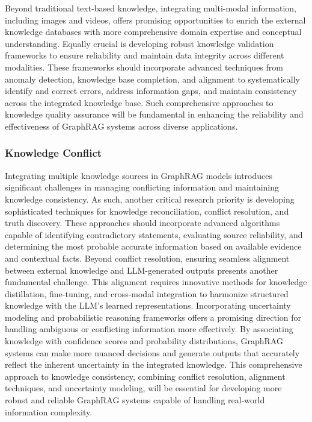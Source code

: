 \documentclass[lettersize,journal]{IEEEtran}
\begin{document}
Beyond traditional text-based knowledge, integrating multi-modal information, including images and videos, offers promising opportunities to enrich the external knowledge databases with more comprehensive domain expertise and conceptual understanding. Equally crucial is developing robust knowledge validation frameworks to ensure reliability and maintain data integrity across different modalities. These frameworks should incorporate advanced techniques from anomaly detection, knowledge base completion, and alignment to systematically identify and correct errors, address information gaps, and maintain consistency across the integrated knowledge base. Such comprehensive approaches to knowledge quality assurance will be fundamental in enhancing the reliability and effectiveness of GraphRAG systems across diverse applications.

\subsubsection{Knowledge Conflict}
Integrating multiple knowledge sources in GraphRAG models introduces significant challenges in managing conflicting information and maintaining knowledge consistency. As such, another critical research priority is developing sophisticated techniques for knowledge reconciliation, conflict resolution, and truth discovery. These approaches should incorporate advanced algorithms capable of identifying contradictory statements, evaluating source reliability, and determining the most probable accurate information based on available evidence and contextual facts. Beyond conflict resolution, ensuring seamless alignment between external knowledge and LLM-generated outputs presents another fundamental challenge. This alignment requires innovative methods for knowledge distillation, fine-tuning, and cross-modal integration to harmonize structured knowledge with the LLM's learned representations. Incorporating uncertainty modeling and probabilistic reasoning frameworks offers a promising direction for handling ambiguous or conflicting information more effectively. By associating knowledge with confidence scores and probability distributions, GraphRAG systems can make more nuanced decisions and generate outputs that accurately reflect the inherent uncertainty in the integrated knowledge. This comprehensive approach to knowledge consistency, combining conflict resolution, alignment techniques, and uncertainty modeling, will be essential for developing more robust and reliable GraphRAG systems capable of handling real-world information complexity.
\end{document}
